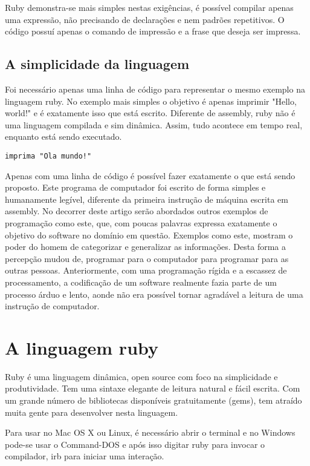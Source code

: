 \documentclass[12pt]{article}
\begin{document}
 Ruby demonstra-se mais simples nestas exigências, é possível compilar apenas uma expressão, não precisando de declarações e nem padrões repetitivos. O código possuí apenas o comando de impressão e a frase que deseja ser impressa.

\subsection { A simplicidade da linguagem }

Foi necessário apenas uma linha de código para representar o mesmo exemplo na linguagem ruby. No exemplo mais simples o objetivo é apenas imprimir "Hello, world!" e é exatamente isso que está escrito. Diferente de assembly, ruby não é uma linguagem compilada e sim dinâmica. Assim, tudo acontece em tempo real, enquanto está sendo executado.
   
\begin{lstlisting}[caption=Tradução do programa ruby]
   imprima "Ola mundo!"
\end{lstlisting}

Apenas com uma linha de código é possível fazer exatamente o que está sendo proposto. Este programa de computador foi escrito de forma simples e humanamente legível, diferente da primeira instrução de máquina escrita em assembly. No decorrer deste artigo serão abordados outros exemplos de programação como este, que, com poucas palavras expressa exatamente o objetivo do software no domínio em questão.
Exemplos como este, mostram o poder do homem de categorizar e generalizar as informações. Desta forma a percepção mudou de, programar para o computador para programar para as outras pessoas. Anteriormente, com uma programação rígida e a escassez de processamento, a codificação de um software realmente fazia parte de um processo árduo e lento, aonde não era possível tornar agradável a leitura de uma instrução de computador.


\section { A linguagem ruby }

Ruby é uma linguagem dinâmica, open source com foco na simplicidade e produtividade. Tem uma sintaxe elegante de leitura natural e fácil escrita. Com um grande número de bibliotecas disponíveis gratuitamente (gems), tem atraído muita gente para desenvolver nesta linguagem.

Para usar no Mac OS X ou Linux, é necessário abrir o {terminal} e  no Windows pode-se usar o Command-DOS e após isso digitar ruby para invocar o compilador, irb para iniciar uma interação.
\end{document}
